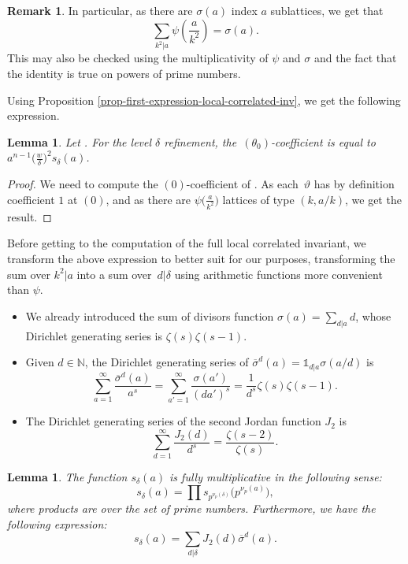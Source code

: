 \documentclass[11pt]{article}
\numberwithin{equation}{section}
\newcommand{\NN}{\mathbb{N}}
\numberwithin{equation}{section}
\newtheorem{lem}[theo]{Lemma}
\theoremstyle{definition}
\newtheorem{remarkk}[theo]{Remark}
\begin{document}
\begin{remarkk}
In particular, as there are $\sigma(a)$ index $a$ sublattices, we get that
\[ \sum_{k^2|a}\psi\left(\frac{a}{k^2}\right)=\sigma(a). \]
This may also be checked using the multiplicativity of $\psi$ and $\sigma$ and the fact that the identity is true on powers of prime numbers.
\end{remarkk}

Using Proposition \ref{prop-first-expression-local-correlated-inv}, we get the following expression.

\begin{lem}
Let . For the level $\delta$ refinement, the~$(\theta_0)$-coefficient is equal to $a^{n-1}\bigl(\frac{w}{\delta}\bigr)^2s_\delta(a)$.
\end{lem}

\begin{proof}
We need to compute the $(0)$-coefficient of . As each~$\vartheta$ has by definition coefficient $1$ at $(0)$, and as there are $\psi\bigl(\frac{a}{k^2}\bigr)$ lattices of type $(k,a/k)$, we get the result.
\end{proof}

Before getting to the computation of the full local correlated invariant, we transform the above expression to better suit for our purposes, transforming the sum over $k^2|a$ into a sum over~$d|\delta$ using arithmetic functions more convenient than $\psi$.
\begin{itemize}\itemsep=0pt %
 \item We already introduced the sum of divisors function $\sigma(a)=\sum_{d|a}d$, whose Dirichlet generating series is $\zeta(s)\zeta(s-1)$.
 \item Given $d\in\NN$, the Dirichlet generating series of $\overline{\sigma}^d(a)=\mathds{1}_{d|a}\sigma(a/d)$ is
\[ \sum_{a=1}^\infty \frac{\overline{\sigma}^d(a)}{a^s} = \sum_{a'=1}^\infty \frac{\sigma(a')}{(da')^s}=\frac{1}{d^s}\zeta(s)\zeta(s-1). \]
 \item The Dirichlet generating series of the second Jordan function $J_2$ is
\[ \sum_{d=1}^\infty \frac{J_2(d)}{d^s}=\frac{\zeta(s-2)}{\zeta(s)}. \]
\end{itemize}

\begin{lem}
The function $s_\delta(a)$ is fully multiplicative in the following sense:
\[ s_\delta(a)=\prod s_{p^{\nu_p(\delta)}}\bigl(p^{\nu_p(a)}\bigr), \]
where products are over the set of prime numbers. Furthermore, we have the following expression:
\[ s_\delta(a)=\sum_{d|\delta} J_2(d)\overline{\sigma}^d(a). \]
\end{lem}
\end{document}
